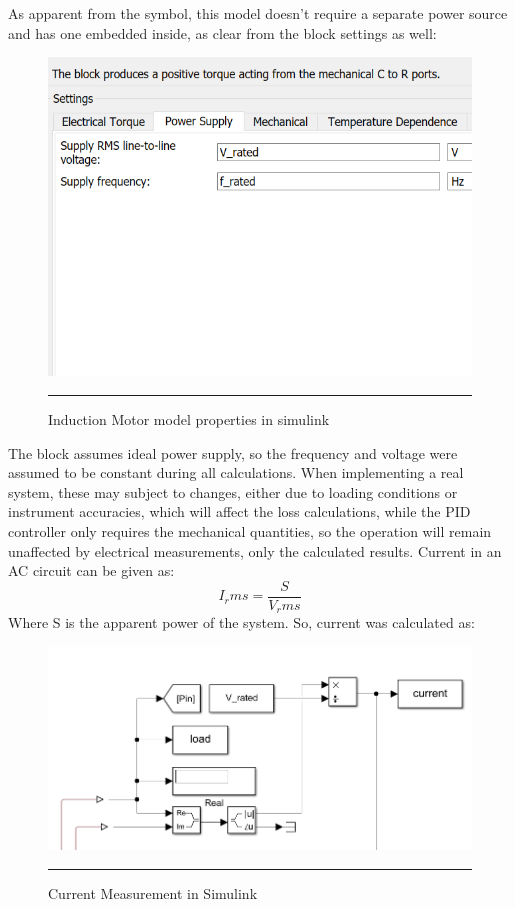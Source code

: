 As apparent from the symbol, this model doesn’t require a separate power source and has one embedded inside, as clear from the block settings as well:
\begin{figure}[htbp]
	\centering
		\includegraphics[width = 4.5in]{./Figures/MS/fig325.png}
		\rule{35em}{0.5pt}
	\caption{Induction Motor model properties in simulink}
	\label{fig:Induction Motor model properties in simulink} 
\end{figure}
The block assumes ideal power supply, so the frequency and voltage were assumed to be constant during all calculations. When implementing a real system, these may subject to changes, either due to loading conditions or instrument accuracies, which will affect the loss calculations, while the PID controller only requires the mechanical quantities, so the operation will remain unaffected by electrical measurements, only the calculated results. Current in an AC circuit can be given as:
\begin{equation}
	I_rms=\frac{S}{V_rms}
\end{equation}
Where S is the apparent power of the system. So, current was calculated as:
\begin{figure}[htbp]
	\centering
		\includegraphics[width = 4.5in]{./Figures/MS/fig326.png}
		\rule{35em}{0.5pt}
	\caption{Current Measurement in Simulink}
	\label{fig:Current Measurement in Simulink} 
\end{figure}

